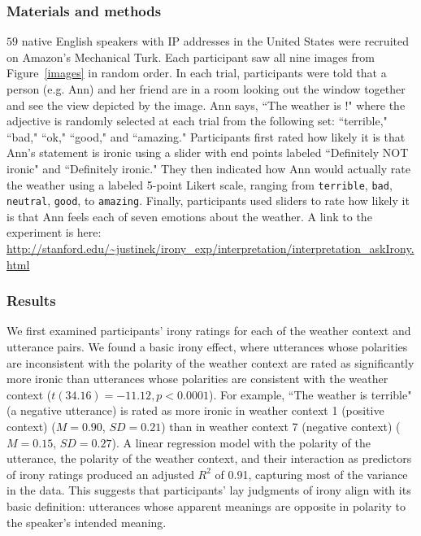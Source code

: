 \documentclass[10pt,letterpaper]{article}
\begin{document}
\subsubsection{Materials and methods}
$59$ native English speakers with IP addresses in the United States were recruited on Amazon's Mechanical Turk. Each participant saw all nine images from Figure~\ref{images} in random order. In each trial, participants were told that a person (e.g. Ann) and her friend are in a room looking out the window together and see the view depicted by the image. Ann says, ``The weather is \underline{\hspace{1cm}}!" where the adjective is randomly selected at each trial from the following set: ``terrible," ``bad," ``ok," ``good," and ``amazing." Participants first rated how likely it is that Ann's statement is ironic using a slider with end points labeled ``Definitely NOT ironic" and ``Definitely ironic." They then indicated how Ann would actually rate the weather using a labeled 5-point Likert scale, ranging from \texttt{terrible}, \texttt{bad}, \texttt{neutral}, \texttt{good}, to \texttt{amazing}. Finally, participants used sliders to rate how likely it is that Ann feels each of seven emotions about the weather. A link to the experiment is here: \url{http://stanford.edu/~justinek/irony_exp/interpretation/interpretation_askIrony.html}

\subsubsection{Results}
We first examined participants' irony ratings for each of the weather context and utterance pairs. We found a basic irony effect, where utterances whose polarities are inconsistent with the polarity of the weather context are rated as significantly more ironic than utterances whose polarities are consistent with the weather context ($t(34.16)= -11.12, p < 0.0001$). For example, ``The weather is terrible" (a negative utterance) is rated as more ironic in weather context 1 (positive context) ($M = 0.90$, $SD = 0.21$) than in weather context 7 (negative context) ($M =0.15$,	$SD = 0.27$). A linear regression model with the polarity of the utterance, the polarity of the weather context, and their interaction as predictors of irony ratings produced an adjusted $R^{2}$ of 0.91, capturing most of the variance in the data. This suggests that participants' lay judgments of irony align with its basic definition: utterances whose apparent meanings are opposite in polarity to the speaker's intended meaning.
\end{document}
